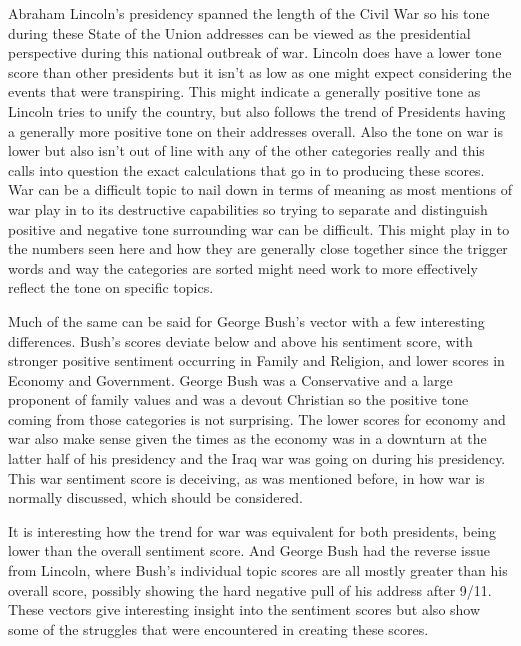 Abraham Lincoln's presidency spanned the length of the Civil War so his tone during these State of the Union addresses can be viewed as the presidential perspective during this national outbreak of war.
Lincoln does have a lower tone score than other presidents but it isn't as low as one might expect considering the events that were transpiring.
This might indicate a generally positive tone as Lincoln tries to unify the country, but also follows the trend of Presidents having a generally more positive tone on their addresses overall.
Also the tone on war is lower but also isn't out of line with any of the other categories really and this calls into question the exact calculations that go in to producing these scores.
War can be a difficult topic to nail down in terms of meaning as most mentions of war play in to its destructive capabilities so trying to separate and distinguish positive and negative tone surrounding war can be difficult.
This might play in to the numbers seen here and how they are generally close together since the trigger words and way the categories are sorted might need work to more effectively reflect the tone on specific topics.

Much of the same can be said for George Bush's vector with a few interesting differences.
Bush's scores deviate below and above his sentiment score, with stronger positive sentiment occurring in Family and Religion, and lower scores in Economy and Government.
George Bush was a Conservative and a large proponent of family values and was a devout Christian so the positive tone coming from those categories is not surprising.
The lower scores for economy and war also make sense given the times as the economy was in a downturn at the latter half of his presidency and the Iraq war was going on during his presidency.
This war sentiment score is deceiving, as was mentioned before, in how war is normally discussed, which should be considered.

It is interesting how the trend for war was equivalent for both presidents, being lower than the overall sentiment score.
And George Bush had the reverse issue from Lincoln, where Bush's individual topic scores are all mostly greater than his overall score, possibly showing the hard negative pull of his address after 9/11.
These vectors give interesting insight into the sentiment scores but also show some of the struggles that were encountered in creating these scores.

